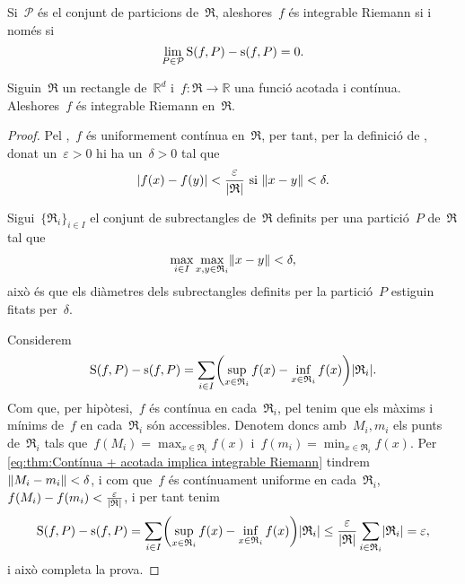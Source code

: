 \documentclass[../../main.tex]{subfiles}
\begin{document}
    \begin{corollary}\label{corollary:Sumes superior i inferior iguals integrable Riemann}
        Si~\(\mathcal{P}\) és el conjunt de particions de~\(\mathfrak{R}\), aleshores~\(f\) és integrable Riemann si i només si
        \[
            \lim_{P\in\mathcal{P}}\operatorname{S}(f,P)-\operatorname{s}(f,P)=0.
        \]%
    \end{corollary}
    \begin{theorem}
        \label{thm:Contínua + acotada implica integrable Riemann}
        Siguin~\(\mathfrak{R}\) un rectangle de~\(\mathbb{R}^{d}\) i~\(f\colon\mathfrak{R}\to\mathbb{R}\) una funció acotada i contínua.
        Aleshores~\(f\) és integrable Riemann en~\(\mathfrak{R}\).
    \end{theorem}
    \begin{proof}
        Pel ,~\(f\) és uniformement contínua en~\(\mathfrak{R}\), per tant, per la definició de , donat un~\(\varepsilon>0\) hi ha un~\(\delta>0\) tal que
        \[
            \abs{f(x)-f(y)}<\frac{\varepsilon}{\abs{\mathfrak{R}}}\text{ si }\norm{x-y}<\delta.
        \]

        Sigui~\(\{\mathfrak{R}_{i}\}_{i\in I}\) el conjunt de subrectangles de~\(\mathfrak{R}\) definits per una partició~\(P\) de~\(\mathfrak{R}\) tal que
        \[
            \max_{i\in I}\max_{x,y\in \mathfrak{R}_{i}}\norm{x-y}<\delta,
        \]
        això és que els diàmetres dels subrectangles definits per la partició~\(P\) estiguin fitats per~\(\delta\).

        Considerem
        \begin{equation}\label{eq:thm:Contínua + acotada implica integrable Riemann}
        \Ssup(f,P)-\sinf(f,P)=\sum_{i\in I}\left(\sup_{x\in \mathfrak{R}_{i}}f(x)-\inf_{x\in \mathfrak{R}_{i}}f(x)\right)\abs{\mathfrak{R}_{i}}.
        \end{equation}
        Com que, per hipòtesi,~\(f\) és contínua en cada~\(\mathfrak{R}_{i}\), pel  tenim que els màxims i mínims de~\(f\) en cada~\(\mathfrak{R}_{i}\) són accessibles.
        Denotem doncs amb~\(M_{i},m_{i}\) els punts de~\(\mathfrak{R}_{i}\) tals que~\(f(M_{i})=\max_{x\in \mathfrak{R}_{i}}f(x)\) i~\(f(m_{i})=\min_{x\in \mathfrak{R}_{i}}f(x)\).
        Per \eqref{eq:thm:Contínua + acotada implica integrable Riemann} tindrem~\(\norm{M_{i}-m_{i}}<\delta\), i com que~\(f\) és contínuament uniforme en cada~\(\mathfrak{R}_{i}\),~\(f(M_{i})-f(m_{i})<\frac{\varepsilon}{\abs{\mathfrak{R}}}\), i per tant tenim
        \[
            \Ssup(f,P)-\sinf(f,P)=\sum_{i\in I}\left(\sup_{x\in \mathfrak{R}_{i}}f(x)-\inf_{x\in \mathfrak{R}_{i}}f(x)\right)\abs{\mathfrak{R}_{i}}\leq\frac{\varepsilon}{\abs{\mathfrak{R}}}\sum_{i\in \mathfrak{R}_{i}}\abs{\mathfrak{R}_{i}}=\varepsilon,
        \]
        i això completa la prova.
    \end{proof}
\end{document}
